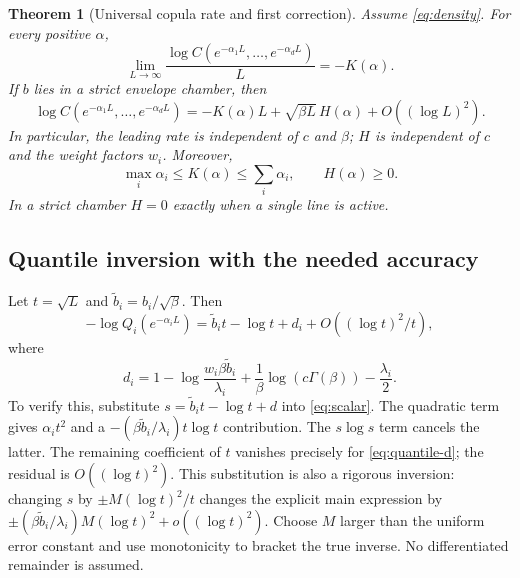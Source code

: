 \documentclass[11pt,a4paper]{article}
\newtheorem{theorem}{Theorem}[section]
\theoremstyle{definition}
\theoremstyle{remark}
\numberwithin{equation}{section}
\begin{document}
\begin{theorem}[Universal copula rate and first correction]
\label{thm:copula}
Assume \eqref{eq:density}. For every positive $\alpha$,
\begin{equation}
 \lim_{L\to\infty}
 \frac{\log C(e^{-\alpha_1L},\ldots,e^{-\alpha_dL})}{L}
 =-K(\alpha).
 \label{eq:copula-leading}
\end{equation}
If $b$ lies in a strict envelope chamber, then
\begin{equation}
 \log C(e^{-\alpha_1L},\ldots,e^{-\alpha_dL})
 =-K(\alpha)L+\sqrt{\beta L}\,H(\alpha)
       +O((\log L)^2).
 \label{eq:copula-sharp}
\end{equation}
In particular, the leading rate is independent of $c$ and $\beta$;
$H$ is independent of $c$ and the weight factors $w_i$. Moreover,
\begin{equation}
 \max_i\alpha_i\le K(\alpha)\le\sum_i\alpha_i,
 \qquad H(\alpha)\ge0.
 \label{eq:copula-bounds}
\end{equation}
In a strict chamber $H=0$ exactly when a single line is active.
\end{theorem}

\subsection{Quantile inversion with the needed accuracy}
Let $t=\sqrt L$ and $\widetilde b_i=b_i/\sqrt\beta$. Then
\begin{equation}
 -\log Q_i(e^{-\alpha_iL})
 =\widetilde b_i t-\log t+d_i
      +O((\log t)^2/t),
 \label{eq:quantile}
\end{equation}
where
\begin{equation}
 d_i=1-\log\frac{w_i\beta\widetilde b_i}{\lambda_i}
   +\frac1\beta\log(c\Gamma(\beta))-\frac{\lambda_i}{2}.
 \label{eq:quantile-d}
\end{equation}
To verify this, substitute $s=\widetilde b_i t-\log t+d$ into
\eqref{eq:scalar}. The quadratic term gives $\alpha_i t^2$ and a
$-(\beta\widetilde b_i/\lambda_i)t\log t$ contribution. The
$s\log s$ term cancels the latter. The remaining coefficient of $t$
vanishes precisely for \eqref{eq:quantile-d}; the residual is
$O((\log t)^2)$. This substitution is also a rigorous inversion: changing
$s$ by $\pm M(\log t)^2/t$ changes the explicit main expression by
$\pm(\beta\widetilde b_i/\lambda_i)M(\log t)^2+o((\log t)^2)$.
Choose $M$ larger than the uniform error constant and use monotonicity to
bracket the true inverse. No differentiated remainder is assumed.
\end{document}

